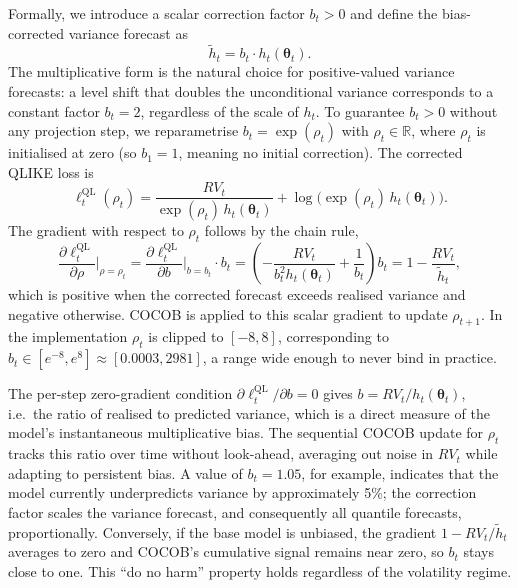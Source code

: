 Formally, we introduce a scalar correction factor $b_t > 0$ and define the bias-corrected variance forecast as
\begin{equation}\label{eq:bias_corrected}
    \tilde{h}_t = b_t \cdot h_t(\boldsymbol{\theta}_t).
\end{equation}
The multiplicative form is the natural choice for positive-valued variance forecasts: a level shift that doubles the unconditional variance corresponds to a constant factor $b_t = 2$, regardless of the scale of $h_t$. To guarantee $b_t > 0$ without any projection step, we reparametrise $b_t = \exp(\rho_t)$ with $\rho_t \in \mathbb{R}$, where $\rho_t$ is initialised at zero (so $b_1 = 1$, meaning no initial correction). The corrected QLIKE loss is
\begin{equation}\label{eq:qlike_bias}
    \ell_t^{\mathrm{QL}}(\rho_t) = \frac{RV_t}{\exp(\rho_t)\, h_t(\boldsymbol{\theta}_t)} + \log\!\bigl(\exp(\rho_t)\, h_t(\boldsymbol{\theta}_t)\bigr).
\end{equation}
The gradient with respect to $\rho_t$ follows by the chain rule,
\begin{equation}\label{eq:grad_rho}
    \frac{\partial \ell_t^{\mathrm{QL}}}{\partial \rho} \Bigg|_{\rho = \rho_t} = \frac{\partial \ell_t^{\mathrm{QL}}}{\partial b}\Bigg|_{b=b_t} \cdot b_t = \left(-\frac{RV_t}{b_t^2 h_t(\boldsymbol{\theta}_t)} + \frac{1}{b_t}\right) b_t = 1 - \frac{RV_t}{\tilde{h}_t},
\end{equation}
which is positive when the corrected forecast exceeds realised variance and negative otherwise. COCOB is applied to this scalar gradient to update $\rho_{t+1}$. In the implementation $\rho_t$ is clipped to $[-8, 8]$, corresponding to $b_t \in [e^{-8}, e^{8}] \approx [0.0003, 2981]$, a range wide enough to never bind in practice.

The per-step zero-gradient condition $\partial \ell_t^{\mathrm{QL}} / \partial b = 0$ gives $b = RV_t / h_t(\boldsymbol{\theta}_t)$, i.e.\ the ratio of realised to predicted variance, which is a direct measure of the model's instantaneous multiplicative bias. The sequential COCOB update for $\rho_t$ tracks this ratio over time without look-ahead, averaging out noise in $RV_t$ while adapting to persistent bias. A value of $b_t = 1.05$, for example, indicates that the model currently underpredicts variance by approximately 5\%; the correction factor scales the variance forecast, and consequently all quantile forecasts, proportionally. Conversely, if the base model is unbiased, the gradient $1 - RV_t / \tilde{h}_t$ averages to zero and COCOB's cumulative signal remains near zero, so $b_t$ stays close to one. This ``do no harm'' property holds regardless of the volatility regime.

